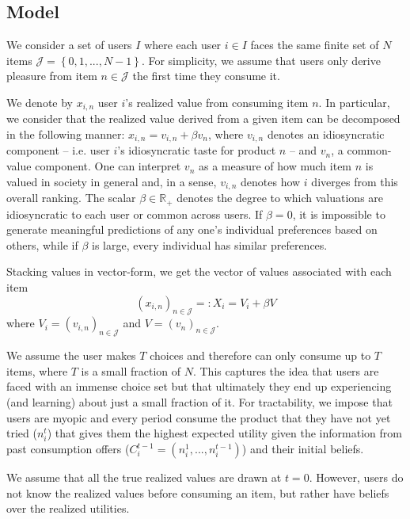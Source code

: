 \documentclass[format=acmsmall, review=false]{acmart}
\newcommand{\xhdr}[1]{\vspace{1mm} \noindent{\bf #1}}
\begin{document}
\subsection{Model}
\par
\xhdr{Users.} We consider a set of users $I$ where each user $i \in I$ faces the same finite set of $N$ items $\mathcal J = \left\{0,1,...,N-1\right\}$. For simplicity, we assume that users only derive pleasure from item $n \in \mathcal{J}$ the first time they consume it.
\par

We denote by $x_{i,n}$ user $i$'s realized value from consuming item $n$. In particular, we consider that the realized value derived from a given item can be decomposed in the following manner: $x_{i,n}= v_{i,n} + \beta v_n$, where $v_{i,n}$ denotes an idiosyncratic component -- i.e. user $i$'s idiosyncratic taste for product $n$ --  and $v_{n}$, a common-value component. One can interpret $v_n$ as a measure of how much item $n$ is valued in society in general and, in a sense, $v_{i,n}$ denotes how $i$ diverges from this overall ranking. The scalar $\beta \in \mathbb{R}_{+}$ denotes the degree to which valuations are idiosyncratic to each user or common across users. If $\beta=0$, it is impossible to generate meaningful predictions of any one's individual preferences based on others, while if $\beta$ is large, every individual has similar preferences.
\par
Stacking values in vector-form, we get the vector of values associated with each item 
$${\left(x_{i,n}\right)}_{n \in \mathcal{J}}=:X_i =V_i+ \beta V $$
where $V_i ={\left(v_{i,n}\right)}_{n \in \mathcal{J}}$ and $V={\left(v_{n}\right)}_{n \in \mathcal{J}}$.
\par
\xhdr{User Decision-Making.}
We assume the user makes $T$ choices and therefore can only consume up to $T$ items, where $T$ is a small fraction of $N$. This captures the idea that users are faced with an immense choice set but that ultimately they end up experiencing (and learning) about just a small fraction of it. For tractability, we impose that users are myopic and every period consume the product that they have not yet tried ($n_i^t$) that gives them the highest expected utility given the information from past consumption offers ($C_i^{t-1}=(n_i^1,...,n_i^{t-1})$) and their initial beliefs.
\par
\xhdr{User Beliefs.} We assume that all the true realized values are drawn at $t = 0$. However, users do not know the realized values before consuming an item, but rather have beliefs over the realized utilities.
\end{document}
